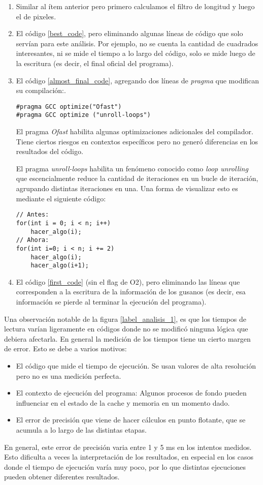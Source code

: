 \documentclass{article}
\begin{document}
\begin{enumerate}
\item Similar al ítem anterior pero primero calculamos el filtro de longitud y luego el de pixeles.

\item \label{almost_final_code} El código \ref{best_code}, pero eliminando algunas líneas de código que solo servían para este análisis. Por ejemplo, no se cuenta la cantidad de cuadrados interesantes, ni se mide el tiempo a lo largo del código, solo se mide luego de la escritura (es decir, el final oficial del programa).

\item \label{final_code} El código \ref{almost_final_code}, agregando dos líneas de \emph{pragma} que modifican su compilación:.
\begin{lstlisting}
#pragma GCC optimize("Ofast")
#pragma GCC optimize ("unroll-loops")
\end{lstlisting}
El pragma \emph{Ofast} habilita algunas optimizaciones adicionales del compilador\cite{ofast}. Tiene ciertos riesgos en contextos específicos pero no generó diferencias en los resultados del código.

El pragma \emph{unroll-loops} habilita un fenómeno conocido como \emph{loop unrolling}\cite{unrolling} que escencialmente reduce la cantidad de iteraciones en un bucle de iteración, agrupando distintas iteraciones en una. Una forma de visualizar esto es mediante el siguiente código:
\begin{lstlisting}
// Antes:
for(int i = 0; i < n; i++)
    hacer_algo(i);
// Ahora:
for(int i=0; i < n; i += 2)
    hacer_algo(i);
    hacer_algo(i+1);
\end{lstlisting}

\item El código \ref{first_code} (sin el flag de O2), pero eliminando las líneas que corresponden a la escritura de la información de los gusanos (es decir, esa información se pierde al terminar la ejecución del programa).
\end{enumerate}

Una observación notable de la figura \ref{label_analisis_1}, es que los tiempos de lectura varían ligeramente en códigos donde no se modificó ninguna lógica que debiera afectarla. En general la medición de los tiempos tiene un cierto margen de error. Esto se debe a varios motivos:
\begin{itemize}
\item El código que mide el tiempo de ejecución. Se usan valores de alta resolución pero no es una medición perfecta.
\item El contexto de ejecución del programa: Algunos procesos de fondo pueden influenciar en el estado de la cache y memoria en un momento dado.
\item El error de precisión que viene de hacer cálculos en punto flotante, que se acumula a lo largo de las distintas etapas.
\end{itemize}
En general, este error de precisión varia entre 1 y 5 ms en los intentos medidos. Esto dificulta a veces la interpretación de los resultados, en especial en los casos donde el tiempo de ejecución varía muy poco, por lo que distintas ejecuciones pueden obtener diferentes resultados.
\end{document}
